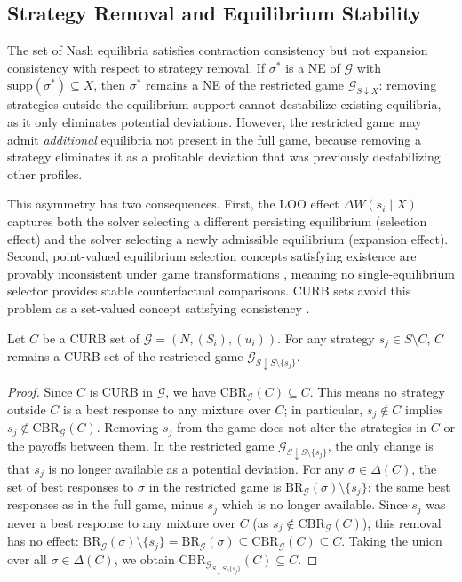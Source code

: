 \documentclass[sigconf,anonymous]{aamas}
\begin{document}
\subsection{Strategy Removal and Equilibrium Stability}

The set of Nash equilibria satisfies contraction consistency
but not expansion consistency with respect to strategy removal.
If $\sigma^*$ is a NE of $\mathcal{G}$ with
$\text{supp}(\sigma^*) \subseteq X$, then $\sigma^*$ remains
a NE of the restricted game $\mathcal{G}_{S \downarrow X}$:
removing strategies outside the equilibrium support cannot
destabilize existing equilibria, as it only eliminates
potential deviations. However, the restricted game may admit
\textit{additional} equilibria not present in the full game,
because removing a strategy eliminates it as a profitable
deviation that was previously destabilizing other profiles.

This asymmetry has two consequences. First, the LOO effect
$\Delta W(s_i \mid X)$ captures both the solver selecting a
different persisting equilibrium (selection effect) and the
solver selecting a newly admissible equilibrium (expansion
effect). Second, point-valued equilibrium selection concepts
satisfying existence are provably inconsistent under game
transformations \citep{norde1996equilibrium}, meaning no
single-equilibrium selector provides stable counterfactual
comparisons. CURB sets avoid this problem as a set-valued
concept satisfying consistency
\citep{voorneveld2005axiomatization}.

\begin{lemma}
Let $C$ be a CURB set of $\mathcal{G} = (N, (S_i), (u_i))$.
For any strategy $s_j \in S \setminus C$, $C$ remains a
CURB set of the restricted game
$\mathcal{G}_{S \downarrow S \setminus \{s_j\}}$.
\end{lemma}

\begin{proof}
Since $C$ is CURB in $\mathcal{G}$, we have
$\text{CBR}_{\mathcal{G}}(C) \subseteq C$. This means
no strategy outside $C$ is a best response to any
mixture over $C$; in particular, $s_j \notin C$ implies
$s_j \notin \text{CBR}_{\mathcal{G}}(C)$. Removing $s_j$ from the game does not alter the strategies in $C$ or the payoffs between them. In the restricted game $\mathcal{G}_{S \downarrow S \setminus \{s_j\}}$, the only change is that $s_j$ is no longer available as a potential deviation. For any $\sigma \in \Delta(C)$, the set of best
responses to $\sigma$ in the restricted game is $\text{BR}_{\mathcal{G}}(\sigma) \setminus \{s_j\}$: the same best responses as in the full game, minus $s_j$ which is no longer available. Since $s_j$ was never a best response to any mixture over $C$ (as $s_j \notin \text{CBR}_{\mathcal{G}}(C)$), this removal has no effect: $\text{BR}_{\mathcal{G}}(\sigma) \setminus \{s_j\} = \text{BR}_{\mathcal{G}}(\sigma) \subseteq \text{CBR}_{\mathcal{G}}(C) \subseteq C$. Taking the union over all $\sigma \in \Delta(C)$, we obtain $\text{CBR}_{\mathcal{G}_{S \downarrow S \setminus \{s_j\}}}(C) \subseteq C$. 
\end{proof}
\end{document}
